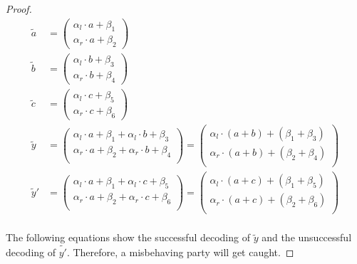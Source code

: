 \begin{proof}
  \begin{align*}
    \widetilde{a} &=
    \begin{pmatrix}
      \alpha_l \cdot a + \beta_1\\
      \alpha_r \cdot a + \beta_2
    \end{pmatrix}\\
    \widetilde{b} &=
    \begin{pmatrix}
      \alpha_l \cdot b + \beta_3\\
      \alpha_r \cdot b + \beta_4
    \end{pmatrix}\\
    \widetilde{c} &=
    \begin{pmatrix}
      \alpha_l \cdot c + \beta_5\\
      \alpha_r \cdot c + \beta_6
    \end{pmatrix}\\
    \widetilde{y} &=
    \begin{pmatrix}
      \alpha_l \cdot a + \beta_1 + \alpha_l \cdot b + \beta_3\\
      \alpha_r \cdot a + \beta_2 + \alpha_r \cdot b + \beta_4\\
    \end{pmatrix} =
    \begin{pmatrix}
      \alpha_l \cdot (a+b) + (\beta_1 + \beta_3)\\
      \alpha_r \cdot (a+b) + (\beta_2 + \beta_4)\\
    \end{pmatrix}\\
    \widetilde{y}' &=
    \begin{pmatrix}
      \alpha_l \cdot a + \beta_1 + \alpha_l \cdot c + \beta_5\\
      \alpha_r \cdot a + \beta_2 + \alpha_r \cdot c + \beta_6\\
    \end{pmatrix} =
    \begin{pmatrix}
      \alpha_l \cdot (a+c) + (\beta_1 + \beta_5)\\
      \alpha_r \cdot (a+c) + (\beta_2 + \beta_6)\\
    \end{pmatrix}\\
  \end{align*}

  \noindent{}The following equations show the successful decoding of
  $\widetilde{y}$ and the unsuccessful decoding of $\widetilde{y'}$. Therefore,
  a misbehaving party will get caught.


\end{proof}
